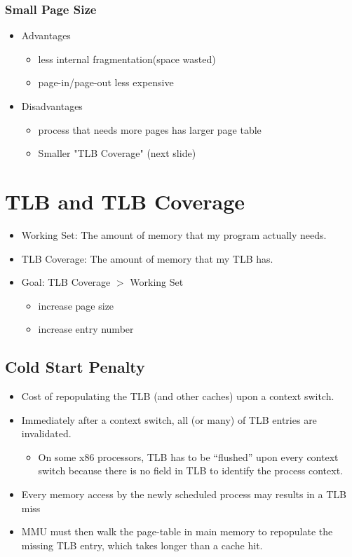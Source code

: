 \documentclass[12pt]{article}
\begin{document}
\subsubsection{Small Page Size}
\begin{itemize}
    \item Advantages \begin{itemize}
        \item less internal fragmentation(space wasted)
        \item page-in/page-out less expensive
    \end{itemize}
    \item Disadvantages \begin{itemize}
        \item process that needs more pages has larger page table
        \item Smaller "TLB Coverage" (next slide)
    \end{itemize}
\end{itemize}

\section{TLB and TLB Coverage}
\begin{itemize}
    \item Working Set: The amount of memory that my program actually needs.
    \item TLB Coverage: The amount of memory that my TLB has.
    \item Goal: TLB Coverage $>$ Working Set \begin{itemize}
        \item increase page size
        \item increase entry number
    \end{itemize}
\end{itemize}
\subsection{Cold Start Penalty}
\begin{itemize}
    \item Cost of repopulating the TLB (and other caches) upon a context switch.
    \item Immediately after a context switch, all (or many) of TLB entries are invalidated. \begin{itemize}
        \item On some x86 processors, TLB has to be “flushed” upon every context switch because there is no field in TLB to identify the process context.
    \end{itemize}
    \item Every memory access by the newly scheduled process may results in a TLB miss
    \item MMU must then walk the page-table in main memory to repopulate the missing TLB entry, which takes longer than a cache hit.
\end{itemize}
\end{document}
